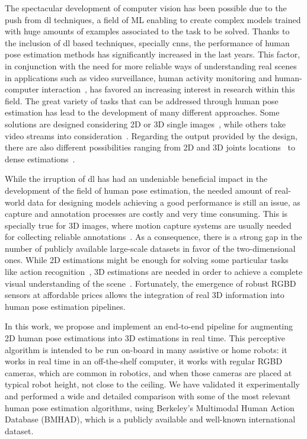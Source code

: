The spectacular development of computer vision has been possible due to the push from \gls{dl} techniques, a field of ML enabling to create complex models trained with huge amounts of examples associated to the task to be solved. Thanks to the inclusion of \gls{dl} based techniques, specially \glspl{cnn}, the performance of human pose estimation methods has significantly increased in the last years. This factor, in conjunction with the need for more reliable ways of understanding real scenes in applications such as video surveillance, human activity monitoring and human-computer interaction~\cite{sarafianos20163d}, has favored an increasing interest in research within this field. The great variety of tasks that can be addressed through human pose estimation has lead to the development of many different approaches. Some solutions are designed considering 2D or 3D single images~\cite{dang2019deep}, while others take video streams into consideration~\cite{Gong2016-kd, ye2013survey}. Regarding the output provided by the design, there are also different possibilities ranging from 2D and 3D joints locations~\cite{perez2014survey} to dense estimations~\cite{Alp_Guler2018-rg}.

While the irruption of \gls{dl} has had an undeniable beneficial impact in the development of the field of human pose estimation, the needed amount of real-world data for designing models achieving a good performance is still an issue, as capture and annotation processes are costly and very time consuming. This is specially true for 3D images, where motion capture systems are usually needed for collecting reliable annotations~\cite{ionescu2013human3, sigal2010humaneva}. As a consequence, there is a strong gap in the number of publicly available large-scale datasets in favor of the two-dimensional ones. While 2D estimations might be enough for solving some particular tasks like action recognition~\cite{liu2018recognizing}, 3D estimations are needed in order to achieve a complete visual understanding of the scene~\cite{sarafianos20163d}. Fortunately, the emergence of robust RGBD sensors at affordable prices allows the integration of real 3D information into human pose estimation pipelines.

In this work, we propose and implement an end-to-end pipeline for augmenting 2D human pose estimations into 3D estimations in real time. This perceptive algorithm is intended to be run on-board in many assistive or home robots: it works in real time in an off-the-shelf computer, it works with regular RGBD cameras, which are common in robotics, and when those cameras are placed at typical robot height, not close to the ceiling. We have validated it experimentally and performed a wide and detailed comparison with some of the most relevant human pose estimation algorithms, using Berkeley's Multimodal Human Action Database (BMHAD)\cite{ofli2013berkeley}, which is a publicly available and well-known international dataset.

